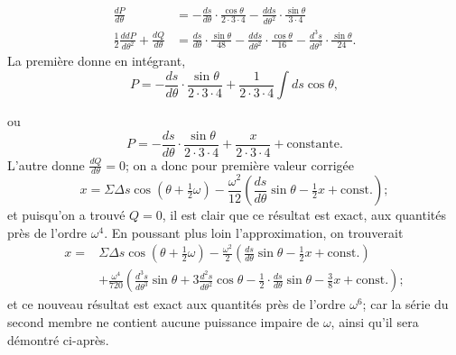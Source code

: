 \documentclass{article}
\begin{document}
\[ \begin{aligned} \frac{dP}{d\theta}&=-\frac{ds}{d\theta}\cdot\frac{\cos\theta}{2\cdot3\cdot4}-\frac{dds}{d\theta^{2}}\cdot\frac{\sin\theta}{3\cdot4}\\ \frac{1}{2}\frac{ddP}{d\theta^{2}}+\frac{dQ}{d\theta}&=\frac{ds}{d\theta}\cdot\frac{\sin\theta}{48}-\frac{dds}{d\theta^{2}}\cdot\frac{\cos\theta}{16}-\frac{d^{3}s}{d\theta^{3}}\cdot\frac{\sin\theta}{24}. \end{aligned} \]
La première donne en intégrant,
\[ P=-\frac{ds}{d\theta}\cdot\frac{\sin\theta}{2\cdot3\cdot4}+\frac{1}{2\cdot3\cdot4}\int ds\cos\theta, \]

ou
\[ P=-\frac{ds}{d\theta}\cdot\frac{\sin\theta}{2\cdot3\cdot4}+\frac{x}{2\cdot3\cdot4}+\text{constante}. \]
L'autre donne $\frac{dQ}{d\theta}=0$; on a donc pour première valeur corrigée
\[ x=\Sigma\Delta s\cos(\theta+\tfrac{1}{2}\omega)-\frac{\omega^{2}}{12}\left(\frac{ds}{d\theta}\sin\theta-\tfrac{1}{2}x+\text{const.}\right); \]
et puisqu'on a trouvé $Q=0$, il est clair que ce résultat est exact, aux quantités près de l'ordre $\omega^{4}$. En poussant plus loin l'approximation, on trouverait
\[ \begin{aligned} x={}&\Sigma\Delta s\cos(\theta+\tfrac{1}{2}\omega)-\frac{\omega^{2}}{2}\left(\frac{ds}{d\theta}\sin\theta-\tfrac{1}{2}x+\text{const.}\right)\\ &+\frac{\omega^{4}}{720}\left(\frac{d^{3}s}{d\theta^{3}}\sin\theta+3\frac{d^{2}s}{d\theta^{2}}\cos\theta-\frac{1}{2}\cdot\frac{ds}{d\theta}\sin\theta-\frac{3}{8}x+\text{const.}\right); \end{aligned} \]
et ce nouveau résultat est exact aux quantités près de l'ordre $\omega^{6}$; car la série du second membre ne contient aucune puissance impaire de $\omega$, ainsi qu'il sera démontré ci-après.
\end{document}
